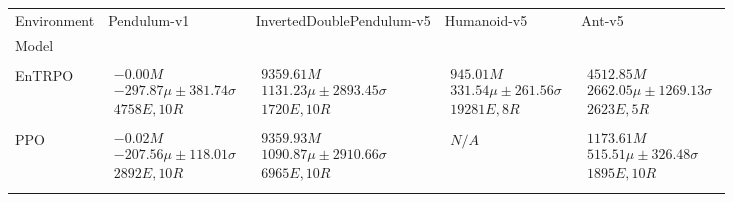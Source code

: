 \begin{tabular}{|l|p{3.2cm}|p{3.2cm}|p{3.2cm}|p{3.2cm}|}
\toprule
Environment & Pendulum-v1 & InvertedDoublePendulum-v5 & Humanoid-v5 & Ant-v5 \\
Model &  &  &  &  \\
\midrule \\ \hline
EnTRPO & $\begin{array}{c} -0.00M \\ -297.87\mu \pm 381.74\sigma \\ 4758E, 10R \end{array}$ & $\begin{array}{c} 9359.61M \\ 1131.23\mu \pm 2893.45\sigma \\ 1720E, 10R \end{array}$ & $\begin{array}{c} 945.01M \\ 331.54\mu \pm 261.56\sigma \\ 19281E, 8R \end{array}$ & $\begin{array}{c} 4512.85M \\ 2662.05\mu \pm 1269.13\sigma \\ 2623E, 5R \end{array}$ \\ \\ \hline
PPO & $\begin{array}{c} -0.02M \\ -207.56\mu \pm 118.01\sigma \\ 2892E, 10R \end{array}$ & $\begin{array}{c} 9359.93M \\ 1090.87\mu \pm 2910.66\sigma \\ 6965E, 10R \end{array}$ & $\begin{array}{c} N/A \end{array}$ & $\begin{array}{c} 1173.61M \\ 515.51\mu \pm 326.48\sigma \\ 1895E, 10R \end{array}$ \\ \\ \hline

\end{tabular}
